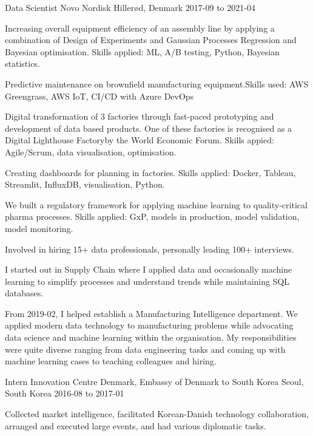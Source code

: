\begin{cventries}
\cventry
{Data Scientist} %
{Novo Nordisk} %
{Hillerød, Denmark} %
{2017-09 to 2021-04} %
{ %
\begin{cvitems}
\item {Increasing overall equipment efficiency of an assembly line by applying a combination of Design of Experiments and Gaussian Processes Regression and Bayesian optimisation. Skills applied: ML, A/B testing, Python, Bayesian statistics.}
\item {Predictive maintenance on brownfield manufacturing equipment.Skills used: AWS Greengrass, AWS IoT, CI/CD with Azure DevOps}
\item {Digital transformation of 3 factories through fast-paced prototyping and development of data based products. One of these factories is recognised as a Digital Lighthouse Factoryby the World Economic Forum. Skills appied: Agile/Scrum, data visualisation, optimisation.}
\item {Creating dashboards for planning in factories. Skills applied: Docker, Tableau, Streamlit, InfluxDB, visualisation, Python.}
\item {We built a regulatory framework for applying machine learning to quality-critical pharma processes. Skills applied: GxP, models in production, model validation, model monitoring.}
\item {Involved in hiring 15+ data professionals, personally leading 100+ interviews.}
\item {I started out in Supply Chain where I applied data and occasionally machine learning to simplify processes and understand trends while maintaining SQL databases.}
\item {From 2019-02, I helped establish a Manufacturing Intelligence department. We applied modern data technology to manufacturing problems while advocating data science and machine learning within the organisation. My responsibilities were quite diverse ranging from data engineering tasks and coming up with machine learning cases to teaching colleagues and hiring.}
\end{cvitems}
}

\cventry
{Intern}
{Innovation Centre Denmark, Embassy of Denmark to South Korea}
{Seoul, South Korea}
{2016-08 to 2017-01}
{
\begin{cvitems}
\item {Collected market intelligence, facilitated Korean-Danish technology collaboration, arranged and executed large events, and had various diplomatic tasks.}
\end{cvitems}
}

\end{cventries}